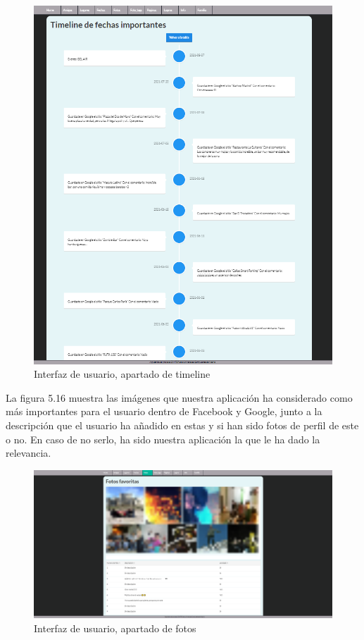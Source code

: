 \begin{figure}
	\begin{center}
		\includegraphics[scale=0.5]{Imagenes/Fuentes/InterfazTimeline.png} \caption{Interfaz de usuario, apartado de timeline}
		\label{WebAplication11}
	\end{center}
\end{figure}
La figura 5.16 muestra las imágenes que nuestra aplicación ha considerado como más importantes para el usuario dentro de Facebook y Google, junto a la descripción que el usuario ha añadido en estas y si han sido fotos de perfil de este o no. En caso de no serlo, ha sido nuestra aplicación la que le ha dado la relevancia.
\begin{figure}
	\begin{center}
		\includegraphics[scale=0.3]{Imagenes/Fuentes/InterfazFotos.png} \caption{Interfaz de usuario, apartado de fotos }
		\label{WebAplication6}
	\end{center}
\end{figure}
